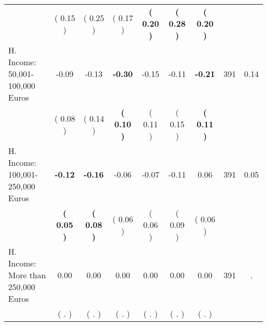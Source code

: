 \begin{tabular}{lcccccccc}
 & (     0.15 ) & (     0.25 ) & (     0.17 ) & \textbf{(     0.20 )} & \textbf{(     0.28 )} & \textbf{(     0.20 )} & \\
H. Income: 50,001-100,000 Euros &     -0.09 &     -0.13 & \textbf{    -0.30} &     -0.15 &     -0.11 & \textbf{    -0.21} & 391 &       0.14 \\ 
 & (     0.08 ) & (     0.14 ) & \textbf{(     0.10 )} & (     0.11 ) & (     0.15 ) & \textbf{(     0.11 )} & \\
H. Income: 100,001-250,000 Euros & \textbf{    -0.12} & \textbf{    -0.16} &     -0.06 &     -0.07 &     -0.11 &      0.06 & 391 &       0.05 \\ 
 & \textbf{(     0.05 )} & \textbf{(     0.08 )} & (     0.06 ) & (     0.06 ) & (     0.09 ) & (     0.06 ) & \\
H. Income: More than 250,000 Euros &      0.00 &      0.00 &      0.00 &      0.00 &      0.00 &      0.00 & 391 &          . \\ 
 & (        . ) & (        . ) & (        . ) & (        . ) & (        . ) & (        . ) & \\
\bottomrule
\end{tabular}
